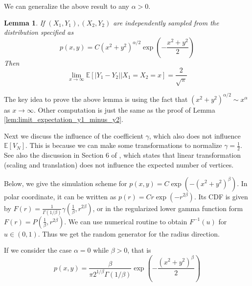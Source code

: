 \documentclass{article}
\newtheorem{lemma}{Lemma}
\def\E{\mathbb{E}}
\begin{document}
We can generalize the above result to any $\alpha>0$.
\begin{lemma}
    If $(X_1,Y_1), (X_2,Y_2)$ are independently
    sampled from the distribution specified as
    \begin{equation}\label{eq:exponential_tail_2d_alpha}
        p(x,y) = C(x^2+y^2)^{\alpha/2} \exp(-\frac{x^2+y^2}{2})    
    \end{equation}   
    Then 
    \begin{equation}\label{eq:abs_y1_y2_x_exp_tail_2}
    \lim_{x\to \infty} \E[|Y_1-Y_2| \Big\vert X_1=X_2=x] = \frac{2}{\sqrt{\pi}}
    \end{equation}
    \end{lemma}
The key idea to prove the above lemma is using the fact that
$(x^2+y^2)^{\alpha/2} \sim x^{\alpha}$ as $x\to \infty$.
Other computation is just the same as the proof of Lemma \ref{lem:limit_expectation_y1_minus_y2}.

Next we discuss the influence of the coefficient $\gamma$, which also does not influence $\E[V_N]$.
This is because we can make some transformations to normalize $\gamma=\frac{1}{2}$.
See also the discussion in Section 6 of \cite{efron1965convex}, which states that
linear transformation (scaling and translation)
does not influence the expected number of vertices.

Below, we give the simulation scheme
for $p(x,y)=C\exp(-(x^2+y^2)^\beta)$.
In polar coordinate, it can be written as
$p(r) = C r \exp(-r^{2\beta})$.
Its CDF is given by $F(r) = \frac{1}{\Gamma(1/\beta)}
\gamma(\frac{1}{\beta}, r^{2\beta})$,
or in the regularized lower gamma function
form $F(r) = P(\frac{1}{\beta}, r^{2\beta})$.
We can use numerical routine to obtain $F^{-1}(u)$
for $u\in (0,1)$. Thus we get the random generator for
the radius direction.

If we consider the case $\alpha=0$ while $\beta > 0$,
that is
\begin{equation}\label{eq:joint_pdf_beta_x_y}
    p(x,y)=\frac{\beta}{\pi 2^{1/\beta} \Gamma(1/\beta)}
    \exp \left(-\frac{(x^2+y^2)^{\beta}}{2} \right)        
\end{equation}
\end{document}
